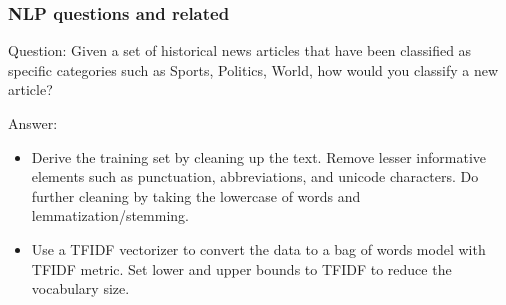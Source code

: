 \documentclass[11pt]{beamer}
\begin{document}
\begin{frame}
\frametitle{NLP questions and related}
\begin{block}{Question:}
	Given a set of historical news articles that have been classified as specific categories such as Sports, Politics, World, how would you classify a new article?
\end{block}
\begin{block}{Answer:}
	\begin{itemize}
		\item Derive the training set by cleaning up the text. Remove lesser informative elements such as punctuation, abbreviations, and unicode characters. Do further cleaning by taking the lowercase of words and lemmatization/stemming.
		\item Use a TFIDF vectorizer to convert the data to a bag of words model with TFIDF metric. Set lower and upper bounds to TFIDF to reduce the vocabulary size.
	\end{itemize}
\end{block}
\end{frame}
\end{document}
